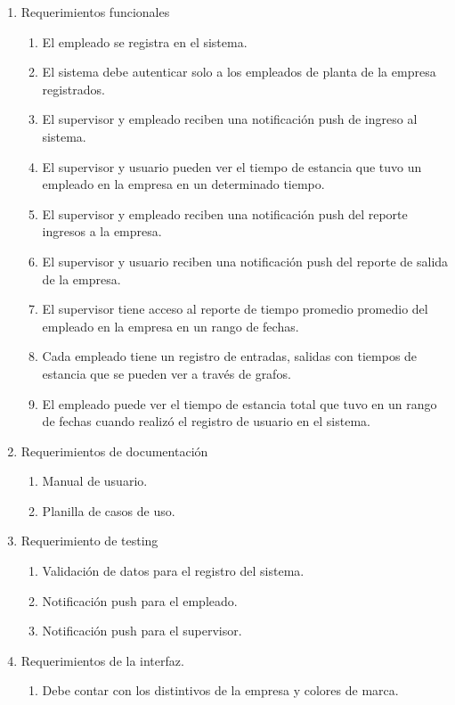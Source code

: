 \documentclass[
11pt, %
]{charter}
\begin{document}
\begin{enumerate}
	\item Requerimientos funcionales
		\begin{enumerate}
			\item El empleado se registra en el sistema.
			\item El sistema debe autenticar solo a los empleados de planta de la empresa registrados.
			\item El supervisor y empleado reciben una notificación push de ingreso al sistema.
			\item El supervisor y usuario pueden ver el tiempo de estancia que tuvo un empleado en la empresa en un determinado tiempo.
			\item El supervisor y empleado reciben una notificación push del reporte ingresos a la empresa.
			\item El supervisor y usuario reciben una notificación push del reporte de salida de la empresa.
			\item El supervisor tiene acceso al reporte de tiempo promedio promedio del empleado en la empresa en un rango de fechas. 
			\item Cada empleado tiene un registro de entradas, salidas con tiempos de estancia que se pueden ver a través de grafos.
			\item El empleado puede ver el tiempo de estancia total  que tuvo en un rango de fechas cuando realizó el registro de usuario en el sistema.
		\end{enumerate}
	\item Requerimientos de documentación
		\begin{enumerate}
			\item Manual de usuario.
			\item Planilla de casos de uso.
		\end{enumerate}
	\item Requerimiento de testing
		\begin{enumerate}
			\item Validación de datos para el registro del sistema.
			\item Notificación push para el empleado.
			\item Notificación push para el supervisor.
		\end{enumerate}
	\item Requerimientos de la interfaz.
			\begin{enumerate}
			\item Debe contar con los distintivos de la empresa y colores de marca.

\end{enumerate}
\end{enumerate}
\end{document}
